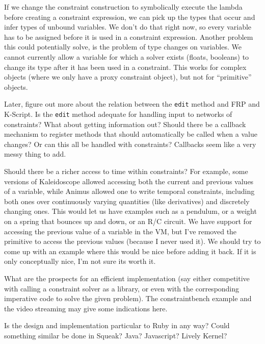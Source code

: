 \documentclass[11pt]{article}
\begin{document}
If we change the constraint construction to symbolically execute the
lambda before creating a constraint expression, we can pick up the
types that occur and infer types of unbound variables. We don't do
that right now, so every variable has to be assigned before it is used
in a constraint expression. Another problem this could potentially
solve, is the problem of type changes on variables. We cannot
currently allow a variable for which a solver exists (floats,
booleans) to change its type after it has been used in a
constraint. This works for complex objects (where we only have a
proxy constraint object), but not for ``primitive'' objects.

Later, figure out more about the relation between the \lstinline{edit}
method and FRP and K-Script.  Is the \lstinline{edit} method adequate
for handling input to networks of constraints?  What about getting
information out?  Should there be a callback mechanism to register
methods that should automatically be called when a value changes?  Or
can this all be handled with constraints?  Callbacks seem like a very
messy thing to add.

Should there be a richer access to time within constraints?  For
example, some versions of Kaleidoscope allowed accessing both the
current and previous values of a variable, while Animus allowed one to
write temporal constraints, including both ones over continuously
varying quantities (like derivatives) and discretely changing ones.
This would let us have examples such as a pendulum, or a weight on a
spring that bounces up and down, or an R/C circuit. We have support
for accessing the previous value of a variable in the VM, but I've
removed the primitive to access the previous values (because I never
used it). We should try to come up with an example where this would be
nice before adding it back. If it is only conceptually nice, I'm not
sure its worth it.

What are the prospects for an efficient implementation (say either
competitive with calling a constraint solver as a library, or even
with the corresponding imperative code to solve the given
problem). The constraintbench example and the video streaming may give
some indications here.

Is the design and implementation particular to Ruby in any way?  Could
something similar be done in Squeak?  Java?  Javascript? Lively Kernel?
\end{document}

